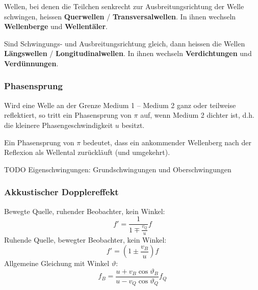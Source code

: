 Wellen, bei denen die Teilchen senkrecht zur Ausbreitungsrichtung der Welle
schwingen, heissen \textbf{Querwellen} / \textbf{Transversalwellen}. In ihnen
wechseln \textbf{Wellenberge} und \textbf{Wellentäler}.


Sind Schwingungs- und Ausbreitungsrichtung gleich, dann heissen die Wellen
\textbf{Längswellen} / \textbf{Longitudinalwellen}. In ihnen wechseln
\textbf{Verdichtungen} und \textbf{Verdünnungen}.


\subsubsection{Phasensprung}

Wird eine Welle an der Grenze Medium 1 -- Medium 2 ganz oder teilweise
reflektiert, so tritt ein Phasensprung von $\pi$ auf, wenn Medium 2 dichter ist,
d.h. die kleinere Phasengeschwindigkeit $u$ besitzt.

Ein Phasensprung von $\pi$ bedeutet, dass ein ankommender Wellenberg nach der
Reflexion als Wellental zurückläuft (und umgekehrt).

TODO Eigenschwingungen: Grundschwingungen und Oberschwingungen

\subsubsection{Akkustischer Dopplereffekt}

Bewegte Quelle, ruhender Beobachter, kein Winkel:
\[
	f' = \frac{1}{1 \mp \frac{v_Q}{u}} f
\]
Ruhende Quelle, bewegter Beobachter, kein Winkel:
\[
	f' = (1 \pm \frac{v_B}{u}) f
\]
Allgemeine Gleichung mit Winkel $\vartheta$:
\[
	f_B = \frac{u + v_B \cos \vartheta_B}{u - v_Q \cos \vartheta_Q} f_Q
\]
